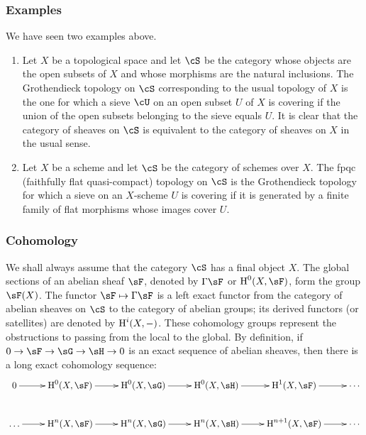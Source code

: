 \subsubsection{Examples}\label{I:1-6-4}

We have seen two examples above.

\begin{enumerate}[\indent a)]
  \item Let $X$ be a topological space and let $\cS$ be the category
    whose objects are the open subsets of $X$ and whose morphisms are the
    natural inclusions. The Grothendieck topology on $\cS$ corresponding
    to the usual topology of $X$ is the one for which a sieve $\cU$ on
    an open subset $U$ of $X$ is covering if the union of the open
    subsets belonging to the sieve equals $U$. It is clear that the
    category of sheaves on $\cS$ is equivalent to the category of sheaves
    on $X$ in the usual sense.
  \item Let $X$ be a scheme and let $\cS$ be the category of schemes over
    $X$. The fpqc (faithfully flat quasi-compact) topology on $\cS$ is
    the Grothendieck topology for which a sieve on an $X$-scheme $U$ is
    covering if it is generated by a finite family of flat morphisms whose
    images cover $U$.
\end{enumerate}

\subsubsection{Cohomology}\label{I:1-6-5}

We shall always assume that the category $\cS$ has a final object $X$.
The global sections of an abelian sheaf $\sF$, denoted by $\Gamma\sF$ or
$\h^0(X,\sF)$, form the group $\sF(X)$. The functor
$\sF\mapsto\Gamma\sF$ is a left exact functor from the category of
abelian sheaves on $\cS$ to the category of abelian groups; its derived
functors (or satellites) are denoted by $\operatorname{H}^i(X,-)$. These cohomology
groups represent the obstructions to passing from the local to the global.
By definition, if $0\to\sF\to\sG\to\sH\to0$ is an exact sequence of
abelian sheaves, then there is a long exact cohomology sequence:
\[\xymatrix{
  0 \ar[r]
    & \h^0(X,\sF) \ar[r]
    & \h^0(X,\sG) \ar[r]
    & \h^0(X,\sH) \ar[r]
    & \h^1(X,\sF) \ar[r]
    & \cdots \\
  \ldots \ar[r]
    & \h^n(X,\sF) \ar[r]
    & \h^n(X,\sG) \ar[r]
    & \h^n(X,\sH) \ar[r]
    & \h^{n+1}(X,\sF) \ar[r]
    & \cdots
}\]

